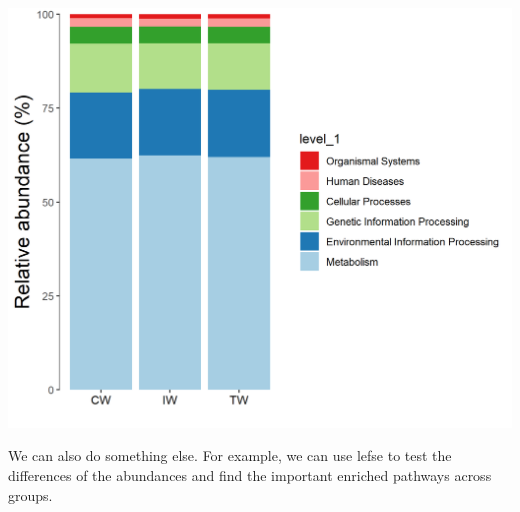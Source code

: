 \documentclass[
]{book}
\newenvironment{Shaded}{\begin{snugshade}}{\end{snugshade}}
\newcommand{\AttributeTok}[1]{\textcolor[rgb]{0.77,0.63,0.00}{#1}}
\newcommand{\ConstantTok}[1]{\textcolor[rgb]{0.00,0.00,0.00}{#1}}
\newcommand{\DecValTok}[1]{\textcolor[rgb]{0.00,0.00,0.81}{#1}}
\newcommand{\FloatTok}[1]{\textcolor[rgb]{0.00,0.00,0.81}{#1}}
\newcommand{\FunctionTok}[1]{\textcolor[rgb]{0.00,0.00,0.00}{#1}}
\newcommand{\NormalTok}[1]{#1}
\newcommand{\OtherTok}[1]{\textcolor[rgb]{0.56,0.35,0.01}{#1}}
\newcommand{\SpecialCharTok}[1]{\textcolor[rgb]{0.00,0.00,0.00}{#1}}
\newcommand{\StringTok}[1]{\textcolor[rgb]{0.31,0.60,0.02}{#1}}
\begin{document}
\begin{center}\includegraphics[width=600px]{Images/plot_bar_tax4fun1} \end{center}

We can also do something else. For example, we can use lefse to test the differences of the abundances and find the important enriched pathways across groups.

\begin{Shaded}
\end{Shaded}
\end{document}
